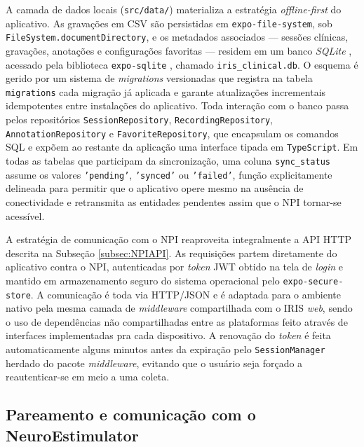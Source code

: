 A camada de dados locais (\texttt{src/data/}) materializa a estratégia \textit{offline-first} do aplicativo. As gravações em CSV são persistidas em \texttt{expo-file-system}, sob \texttt{FileSystem.documentDirectory}, e os metadados associados --- sessões clínicas, gravações, anotações e configurações favoritas --- residem em um banco \textit{SQLite} \cite{sqliteDocs}, acessado pela biblioteca \texttt{expo-sqlite} \cite{expoSqliteDocs}, chamado \texttt{iris\_clinical.db}. O esquema é gerido por um sistema de \textit{migrations} versionadas que registra na tabela \texttt{migrations} cada migração já aplicada e garante atualizações incrementais idempotentes entre instalações do aplicativo. Toda interação com o banco passa pelos repositórios \texttt{SessionRepository}, \texttt{RecordingRepository}, \texttt{AnnotationRepository} e \texttt{FavoriteRepository}, que encapsulam os comandos SQL e expõem ao restante da aplicação uma interface tipada em \texttt{TypeScript}. Em todas as tabelas que participam da sincronização, uma coluna \texttt{sync\_status} assume os valores \texttt{'pending'}, \texttt{'synced'} ou \texttt{'failed'}, função explicitamente delineada para permitir que o aplicativo opere mesmo na ausência de conectividade e retransmita as entidades pendentes assim que o NPI tornar-se acessível.

A estratégia de comunicação com o NPI reaproveita integralmente a API HTTP descrita na Subseção \ref{subsec:NPIAPI}. As requisições partem diretamente do aplicativo contra o NPI, autenticadas por \textit{token} JWT obtido na tela de \textit{login} e mantido em armazenamento seguro do sistema operacional pelo \texttt{expo-secure-store}. A comunicação é toda via HTTP/JSON e é adaptada para o ambiente nativo pela mesma camada de \textit{middleware} compartilhada com o IRIS \textit{web}, sendo o uso de dependências não compartilhadas entre as plataformas feito através de interfaces implementadas pra cada dispositivo. A renovação do \textit{token} é feita automaticamente alguns minutos antes da expiração pelo \texttt{SessionManager} herdado do pacote \textit{middleware}, evitando que o usuário seja forçado a reautenticar-se em meio a uma coleta.

\subsection{Pareamento e comunicação com o NeuroEstimulator}\label{subsec:IRISMobileBT}

